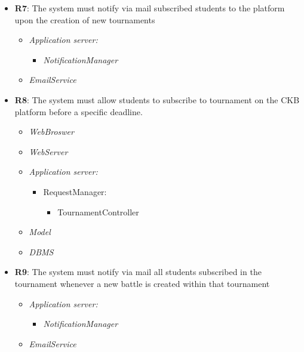 \begin{itemize}
        \item \textbf{R7}: The system must notify via mail subscribed students to the platform upon the creation of new
tournaments
               \begin{itemize}
                 \item \textit{Application server:}\begin{itemize}
                     \item \textit{NotificationManager}
                 \end{itemize}
                \item \textit{EmailService}
                \end{itemize}
 \item \textbf{R8}: The system must allow students to subscribe to tournament on the CKB platform before a specific
deadline.
            \begin{itemize}
                  \item \textit{WebBroswer}
                \item \textit{WebServer}
                \item \textit{Application server:}\begin{itemize}
                    \item RequestManager:\begin{itemize}
                        \item TournamentController
                    \end{itemize}
                \end{itemize}
                \item \textit{Model}
                \item \textit{DBMS}
                \end{itemize}
            
 \item \textbf{R9}: The system must notify via mail all students subscribed in the tournament whenever a new battle
is created within that tournament
             \begin{itemize}
                 \item \textit{Application server:}\begin{itemize}
                     \item \textit{NotificationManager}
                 \end{itemize}
                \item \textit{EmailService}
                \end{itemize}
        

\end{itemize}
